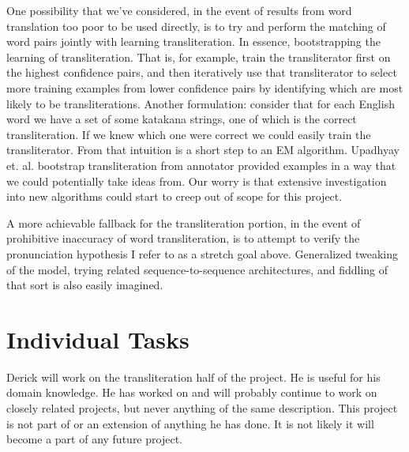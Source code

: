 \documentclass{article}
\begin{document}
One possibility that we've considered,
in the event of results from word translation too poor to be used directly,
is to try and perform the matching of word pairs
jointly with learning transliteration.
In essence, bootstrapping the learning of transliteration.
That is,
for example,
train the transliterator first on the highest confidence pairs,
and then iteratively use that transliterator
to select more training examples from lower confidence pairs
by identifying which are most likely to be transliterations.
Another formulation:
consider that for each English word
we have a set of some katakana strings,
one of which is the correct transliteration.
If we knew which one were correct we could easily train the transliterator.
From that intuition is a short step to an EM algorithm.
Upadhyay et. al. \cite{Upadhyay2018BootstrappingTW}
bootstrap transliteration from annotator provided examples
in a way that we could potentially take ideas from.
Our worry is that extensive investigation into new algorithms
could start to creep out of scope for this project.

A more achievable fallback for the transliteration portion,
in the event of prohibitive inaccuracy of word transliteration,
is to attempt to verify
the pronunciation hypothesis I refer to as a stretch goal above.
Generalized tweaking of the model,
trying related sequence-to-sequence architectures,
and fiddling of that sort is also easily imagined.

\section*{Individual Tasks}

Derick will work on the transliteration half of the project.
He is useful for his domain knowledge.
He has worked on and will probably continue to work on
closely related projects,
but never anything of the same description.
This project is not part of or an extension of anything he has done.
It is not likely it will become a part of any future project.

{}

\end{document}
